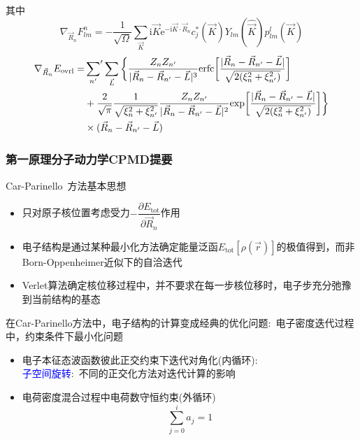 {\begin{itemize}
{{\begin{itemize}
{{\begin{displaymath}
\end{displaymath}
				}}
			\end{itemize}
			其中
			\begin{displaymath}
				\nabla_{\vec R_n}F_{lm}^n=-\dfrac1{\sqrt{\Omega}}\sum_{\vec K}\mathrm{i}\vec K\mathrm{e}^{-\mathrm{i}\vec K\cdot\vec R_n}c_j^{\ast}(\vec K)Y_{lm}(\hat{\vec K})p_{lm}^l(\vec K)
			\end{displaymath}
			\begin{displaymath}
				\begin{aligned}
					\nabla_{\vec R_n}E_{\mathrm{ovrl}}=&\sideset{}{^{\prime}}\sum_{n^{\prime}}\sum_{\vec L}\bigg\{\dfrac{Z_nZ_{n^{\prime}}}{|\vec R_n-\vec R_{n^{\prime}}-\vec L|^3}\mathrm{erfc}\bigg[\dfrac{|\vec R_n-\vec R_{n^{\prime}}-\vec L|}{\sqrt{2(\xi_n^2+\xi_{n^{\prime}}^2)}}\bigg]\\
					&+\dfrac2{\sqrt{\pi}}\dfrac1{\sqrt{\xi_n^2+\xi_{n^{\prime}}^2}}\dfrac{Z_nZ_{n^{\prime}}}{|\vec R_n-\vec R_{n^{\prime}}-\vec L|^2}\mathrm{exp}\bigg[\dfrac{|\vec R_n-\vec R_{n^{\prime}}-\vec L|}{\sqrt{2(\xi_n^2+\xi_{n^{\prime}}^2)}}\bigg]\bigg\}\\
					&\times(\vec R_n-\vec R_{n^{\prime}}-\vec L)
				\end{aligned}
			\end{displaymath}
		}}
	\end{itemize}

}

\frame
{
	\frametitle{第一原理分子动力学\textrm{CPMD}提要}
	\textrm{Car-Parinello~}方法基本思想
	\begin{itemize}
		\item 只对原子核位置考虑受力$-\dfrac{\partial E_{\mathrm{tot}}}{\partial\vec R_n}$作用
		\item 电子结构是通过某种最小化方法确定能量泛函$E_{\mathrm{tot}}[\rho(\vec r)]$的极值得到，而非\textrm{Born-Oppenheimer}近似下的自洽迭代
		\item \textrm{Verlet}算法确定核位移过程中，并不要求在每一步核位移时，电子步充分弛豫到当前结构的基态
	\end{itemize}
	在\textrm{Car-Parinello}方法中，电子结构的计算变成经典的优化问题:~电子密度迭代过程中，约束条件下最小化问题
	\begin{itemize}
		\item 电子本征态波函数彼此正交约束下迭代对角化(内循环):\\
			\textcolor{blue}{子空间旋转}:~不同的正交化方法对迭代计算的影响
		\item 电荷密度混合过程中电荷数守恒约束(外循环)
			\begin{displaymath}
				\sum\limits_{j=0}^i a_j=1
			\end{displaymath}
	\end{itemize}
}

